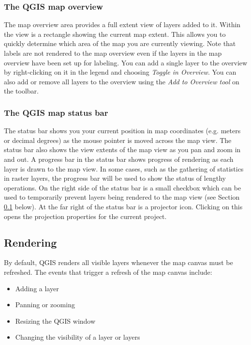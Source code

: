 \subsubsection{The QGIS map overview}\label{label_mapoverview}

The map overview area provides a full extent view of layers added to it.
Within the view is a rectangle showing the current map extent. This allows
you to quickly determine which area of the map you are currently viewing. Note
that labels are not rendered to the map overview even if the layers in the
map overview have been set up for labeling. You can add a single layer to the
overview by right-clicking on it in the legend and choosing \textit{Toggle
in Overview}. You can also add or remove all layers to the overview using the
\textit{Add to Overview tool} on the toolbar.

\subsubsection{The QGIS map status bar}\label{label_statusbar}

The status bar shows you your current position in map coordinates (e.g.
meters or decimal degrees) as the mouse pointer is moved across the map view.
The  status bar also shows the view extents of the map view as you pan and
zoom in and out. A progress bar in the status bar shows progress of rendering
as each layer is drawn to the map view. In some cases, such as the gathering
of statistics in raster layers, the progress bar will be used to show the
status of lengthy operations. On the right side of the status bar is a small
checkbox which can be used to temporarily prevent layers being rendered to the
map view (see Section \ref{subsec:redraw_events} below). At the far right of
the status bar is a projector icon. Clicking on this opens the projection
properties for the current project.

\subsection{Rendering}\label{subsec:redraw_events}

By default, QGIS renders all visible layers whenever the map canvas must be
refreshed. The events that trigger a refresh of the map canvas include:

\begin{itemize}
\item Adding a layer
\item Panning or zooming
\item Resizing the QGIS window
\item Changing the visibility of a layer or layers
\end{itemize}

